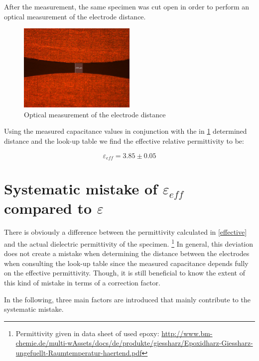 After the measurement, the same specimen was cut open in order to perform an optical measurement of the electrode distance.


\begin{figure}[ht]
	\centering
	\includegraphics[width=0.5\textwidth]{figures/Results/Capacitance_Measure/Sample1_scale.jpg}		
	\caption[Kurze Abbildungsbeschreibung]{Optical measurement of the electrode distance \protect\footnotemark} 
	\label{fig.opticalmeasurement}
\end{figure}
Using the measured capacitance values in conjunction with the in \ref{fig.opticalmeasurement} determined distance and the look-up table
we find the effective relative permittivity to be:

\begin{equation}
 \varepsilon_{eff}=3.85 \pm 0.05
\end{equation}



\section{Systematic mistake of $\varepsilon_{eff}$ compared to $\varepsilon$}
There is obviously a difference between the permittivity calculated in \ref{effective}
and the actual dielectric permittivity of the specimen. \footnote{Permittivity given in data sheet of used epoxy: \url{http://www.bm-chemie.de/multi-wAssets/docs/de/produkte/giessharz/Epoxidharz-Giessharz-ungefuellt-Raumtemperatur-haertend.pdf}}
In general, this deviation does not create a mistake when determining the
distance between the electrodes when consulting the look-up table since the
measured capacitance depends fully on the effective permittivity. Though, it is still
beneficial to know the extent of this kind of mistake in terms of a correction factor.

In the following, three main factors are introduced that mainly contribute to the systematic mistake.

